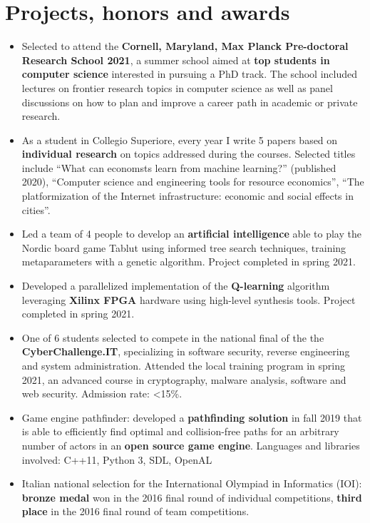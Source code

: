 \documentclass[10pt, a4paper]{extarticle}
\begin{document}
\section*{Projects, honors and awards}
\begin{itemize}
\item Selected to attend the \textbf{Cornell, Maryland, Max Planck Pre-doctoral Research School 2021}, a summer school aimed at \textbf{top students in computer science} interested in pursuing a PhD track.
The school included lectures on frontier research topics in computer science as well as panel discussions on how to plan and improve a career path in academic or private research.
\item As a student in Collegio Superiore, every year I write 5 papers based on \textbf{individual research} on topics addressed during the courses.
Selected titles include ``What can economsts learn from machine learning?'' (published 2020), ``Computer science and engineering tools for resource economics'', ``The platformization of the Internet infrastructure: economic and social effects in cities''.
\item Led a team of 4 people to develop an \textbf{artificial intelligence} able to play the Nordic board game Tablut using informed tree search techniques, training metaparameters with a genetic algorithm.
Project completed in spring 2021.
\item Developed a parallelized implementation of the \textbf{Q-learning} algorithm leveraging \textbf{Xilinx FPGA} hardware using high-level synthesis tools.
Project completed in spring 2021.
\item One of 6 students selected to compete in the national final of the the \textbf{CyberChallenge.IT}, specializing in software security, reverse engineering and system administration.
Attended the local training program in spring 2021, an advanced course in cryptography, malware analysis, software and web security.
Admission rate: <15\%.
\item Game engine pathfinder: developed a \textbf{pathfinding solution} in fall 2019 that is able to efficiently find optimal and collision-free paths for an arbitrary number of actors in an \textbf{open source game engine}.
Languages and libraries involved: C++11, Python 3, SDL, OpenAL
\item Italian national selection for the International Olympiad in Informatics (IOI): \textbf{bronze medal} won in the 2016 final round of individual competitions, \textbf{third place} in the 2016 final round of team competitions.



\end{itemize}
\end{document}
